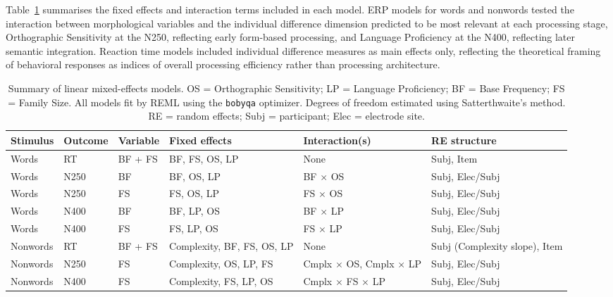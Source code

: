 \documentclass[utf8]{FrontiersinHarvard} %
\begin{document}
	Table~\ref{tab:models} summarises the fixed effects and interaction terms included in each model. ERP models for words and nonwords tested the interaction between morphological variables and the individual difference dimension predicted to be most relevant at each processing stage, Orthographic Sensitivity at the N250, reflecting early form-based processing, and Language Proficiency at the N400, reflecting later semantic integration. Reaction time models included individual difference measures as main effects only, reflecting the theoretical framing of behavioral responses as indices of overall processing efficiency rather than processing architecture.
	
	\begin{table}[h!]
		\centering
		\small
		\renewcommand{\arraystretch}{1.4}
		\caption{Summary of linear mixed-effects models. OS = Orthographic Sensitivity; LP = Language Proficiency; BF = Base Frequency; FS = Family Size. All models fit by REML using the \texttt{bobyqa} optimizer. Degrees of freedom estimated using Satterthwaite's method. RE = random effects; Subj = participant; Elec = electrode site.}
		\label{tab:models}
		\begin{tabular}{p{1.6cm} p{1.2cm} p{1.3cm} p{3.5cm} p{2.8cm} p{2.5cm}}
			\toprule
			\textbf{Stimulus} & \textbf{Outcome} & \textbf{Variable} & \textbf{Fixed effects} & \textbf{Interaction(s)} & \textbf{RE structure} \\
			\midrule
			Words  & RT  & BF + FS & BF, FS, OS, LP       & None                & Subj, Item \\
			Words  & N250 & BF   & BF, OS, LP         & BF $\times$ OS           & Subj, Elec/Subj \\
			Words  & N250 & FS   & FS, OS, LP         & FS $\times$ OS           & Subj, Elec/Subj \\
			Words  & N400 & BF   & BF, LP, OS         & BF $\times$ LP           & Subj, Elec/Subj \\
			Words  & N400 & FS   & FS, LP, OS         & FS $\times$ LP           & Subj, Elec/Subj \\
			Nonwords & RT  & BF + FS & Complexity, BF, FS, OS, LP & None                & Subj (Complexity slope), Item \\
			Nonwords & N250 & FS   & Complexity, OS, LP, FS   & Cmplx $\times$ OS, Cmplx $\times$ LP & Subj, Elec/Subj \\
			Nonwords & N400 & FS   & Complexity, FS, LP, OS   & Cmplx $\times$ FS $\times$ LP    & Subj, Elec/Subj \\
			\bottomrule
		\end{tabular}
	\end{table}
	
\end{document}
